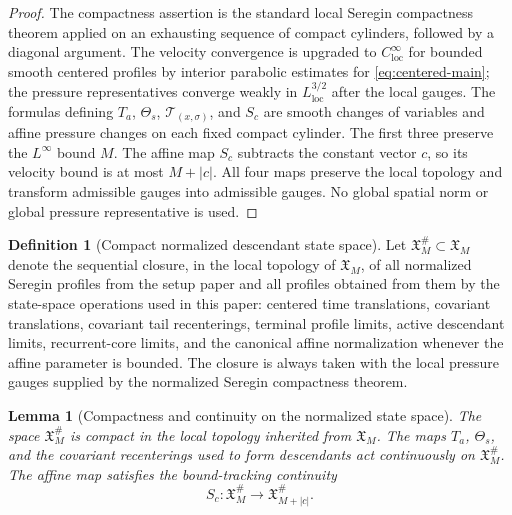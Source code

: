 \documentclass[11pt]{amsart}
\numberwithin{equation}{section}
\theoremstyle{plain}
\newtheorem{lemma}[theorem]{Lemma}
\theoremstyle{definition}
\newtheorem{definition}[theorem]{Definition}
\theoremstyle{remark}
\newcommand{\loc}{\mathrm{loc}}
\begin{document}
\begin{proof}
The compactness assertion is the standard local Seregin compactness theorem
applied on an exhausting sequence of compact cylinders, followed by a diagonal
argument.  The velocity convergence is upgraded to \(C^\infty_{\loc}\) for
bounded smooth centered profiles by interior parabolic estimates for
\eqref{eq:centered-main}; the pressure representatives converge weakly in
\(L^{3/2}_{\loc}\) after the local gauges.  The formulas defining \(T_a\),
\(\Theta_s\), \(\mathscr T_{(x,\sigma)}\), and \(S_c\) are smooth changes of
variables and affine pressure changes on each fixed compact cylinder.  The
first three preserve the \(L^\infty\) bound \(M\).  The affine map \(S_c\)
subtracts the constant vector \(c\), so its velocity bound is at most
\(M+|c|\).  All four maps preserve the local topology and transform admissible
gauges into admissible gauges.  No global spatial norm or global pressure
representative is used.
\end{proof}

\begin{definition}[Compact normalized descendant state space]
\label{def:compact-normalized-state-space}
Let \(\mathfrak X_M^\#\subset\mathfrak X_M\) denote the sequential closure, in
the local topology of \(\mathfrak X_M\), of all normalized Seregin profiles from
the setup paper and all profiles obtained from them by the state-space operations used
in this paper: centered time translations, covariant translations, covariant
tail recenterings, terminal profile limits, active descendant limits, recurrent-core
limits, and the canonical affine normalization whenever the affine parameter is
bounded.  The closure is always taken with the local pressure gauges supplied by
the normalized Seregin compactness theorem.
\end{definition}

\begin{lemma}[Compactness and continuity on the normalized state space]
\label{lem:compact-normalized-state-space}
The space \(\mathfrak X_M^\#\) is compact in the local topology inherited from
\(\mathfrak X_M\).  The maps \(T_a\), \(\Theta_s\), and the covariant
recenterings used to form descendants act continuously on
\(\mathfrak X_M^\#\).  The affine map satisfies the bound-tracking continuity
\[
   S_c:\mathfrak X_M^\#\longrightarrow \mathfrak X_{M+|c|}^\# .
\]
\end{lemma}
\end{document}
